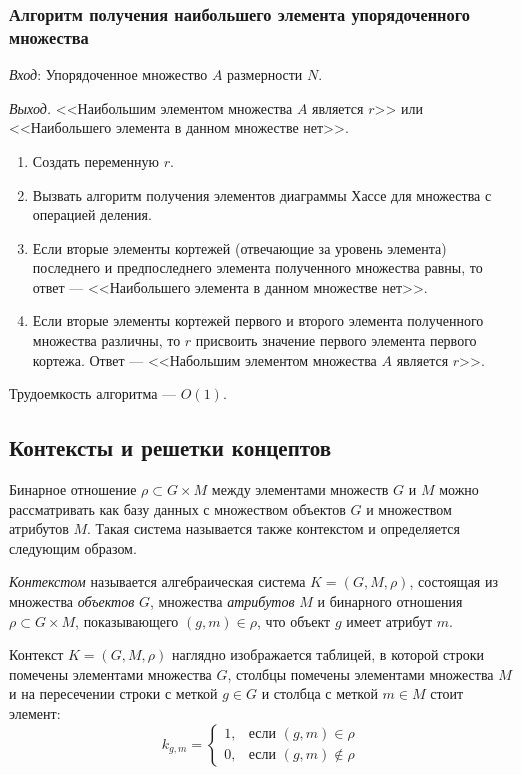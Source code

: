 \documentclass[bachelor, och, labwork]{shiza}
\begin{document}
\subsubsection{Алгоритм получения наибольшего элемента упорядоченного множества}
\textit{Вход}: Упорядоченное множество $A$ размерности $N$.

\textit{Выход.} <<Наибольшим элементом множества $A$ является $r$>> 
или <<Наибольшего элемента в данном множестве нет>>.
\begin{enumerate}
    \item Создать переменную $r$.
    \item Вызвать алгоритм получения элементов диаграммы Хассе для множества с операцией деления.
    \item Если вторые элементы кортежей (отвечающие за уровень элемента) последнего
    и предпоследнего элемента полученного множества равны, то ответ --- <<Наибольшего элемента в данном множестве нет>>.
    \item Если вторые элементы кортежей первого и второго элемента полученного 
    множества различны, то $r$ присвоить значение первого элемента первого кортежа.
    Ответ --- <<Набольшим элементом множества $A$ является $r$>>.
\end{enumerate} 
Трудоемкость алгоритма --- $O(1)$.

\subsection{Контексты и решетки концептов}
Бинарное отношение $\rho \subset G\times M$ между элементами множеств $G$ и $M$
можно рассматривать как базу данных с множеством объектов $G$ и множеством
атрибутов $M$. Такая система называется также контекстом и определяется следующим
образом.

\textit{Контекстом} называется алгебраическая система $K=(G,M,\rho)$, состоящая
из множества \textit{объектов} $G$, множества \textit{атрибутов} $M$ и бинарного
отношения $\rho \subset G\times M$, показывающего $(g,m)\in\rho$, что объект $g$
имеет атрибут $m$.

Контекст $K = (G,M,\rho)$ наглядно изображается таблицей, в которой строки
помечены элементами множества $G$, столбцы помечены элементами множества $M$ и
на пересечении строки с меткой $g \in G$ и столбца с меткой $m \in M$ стоит 
элемент:
\begin{equation*}
    k_{g,m} = 
        \begin{cases}
            1, &\text{если $(g,m) \in \rho$}\\
            0, &\text{если  $(g,m) \not\in \rho$}
        \end{cases}
\end{equation*}
\end{document}
